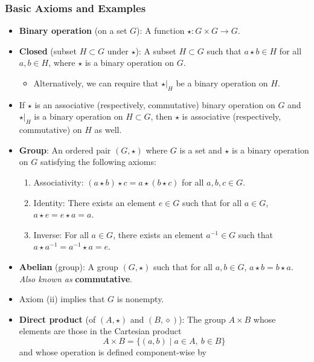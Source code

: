 \documentclass[../main.tex]{subfiles}
\begin{document}
\subsubsection{Basic Axioms and Examples}
\begin{itemize}
    \item {}\textbf{Binary operation} (on a set $G$): A function $\star:G\times G\to G$.
    \item \textbf{Closed} (subset $H\subset G$ under $\star$): A subset $H\subset G$ such that $a\star b\in H$ for all $a,b\in H$, where $\star$ is a binary operation on $G$.
    \begin{itemize}
        \item Alternatively, we can require that $\star|_H$ be a binary operation on $H$.
    \end{itemize}
    \item If $\star$ is an associative (respectively, commutative) binary operation on $G$ and $\star|_H$ is a binary operation on $H\subset G$, then $\star$ is associative (respectively, commutative) on $H$ as well.
    \item \textbf{Group}: An ordered pair $(G,\star)$ where $G$ is a set and $\star$ is a binary operation on $G$ satisfying the following axioms:
    \begin{enumerate}[label={(\roman*)}]
        \item Associativity: $(a\star b)\star c=a\star(b\star c)$ for all $a,b,c\in G$.
        \item Identity: There exists an element $e\in G$ such that for all $a\in G$, $a\star e=e\star a=a$.
        \item Inverse: For all $a\in G$, there exists an element $a^{-1}\in G$ such that $a\star a^{-1}=a^{-1}\star a=e$.
    \end{enumerate}
    \item \textbf{Abelian} (group): A group $(G,\star)$ such that for all $a,b\in G$, $a\star b=b\star a$. \emph{Also known as} \textbf{commutative}.
    \item Axiom (ii) implies that $G$ is nonempty.
    \item \textbf{Direct product} (of $(A,\star)$ and $(B,\diamond)$): The group $A\times B$ whose elements are those in the Cartesian product
    \begin{equation*}
        A\times B = \{(a,b)\mid a\in A,\ b\in B\}
    \end{equation*}
    and whose operation is defined component-wise by
    \begin{equation*}

\end{equation*}
\end{itemize}
\end{document}
